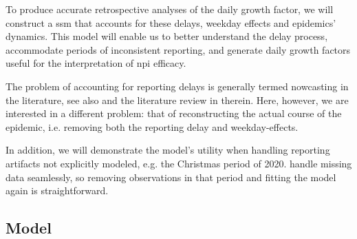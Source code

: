 To produce accurate retrospective analyses of the daily growth factor, we will construct a \acrshort{ssm} that accounts for these delays, weekday effects and epidemics' dynamics. This model will enable us to better understand the delay process, accommodate periods of inconsistent reporting, and generate daily growth factors useful for the interpretation of \acrshort{npi} efficacy.

The problem of accounting for reporting delays is generally termed \glqq{}nowcasting\grqq{} in the literature, see also  and the literature review in therein. Here, however, we are interested in a different problem: that of reconstructing the actual course of the epidemic, i.e. removing both the reporting delay and weekday-effects.


In addition, we will demonstrate the model's utility when handling reporting artifacts not explicitly modeled, e.g. the Christmas period of 2020.  handle missing data seamlessly, so removing observations in that period and fitting the model again is straightforward.

\subsection{Model}


